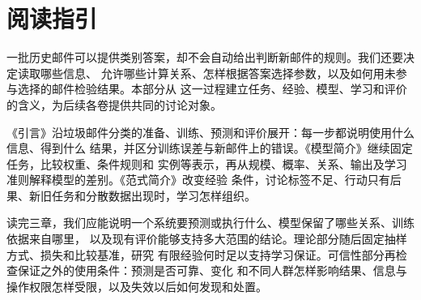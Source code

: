 \chapter*{阅读指引}

一批历史邮件可以提供类别答案，却不会自动给出判断新邮件的规则。我们还要决定读取哪些信息、
允许哪些计算关系、怎样根据答案选择参数，以及如何用未参与选择的邮件检验结果。本部分从
这一过程建立任务、经验、模型、学习和评价的含义，为后续各卷提供共同的讨论对象。

《引言》沿垃圾邮件分类的准备、训练、预测和评价展开：每一步都说明使用什么信息、得到什么
结果，并区分训练误差与新邮件上的错误。《模型简介》继续固定任务，比较权重、条件规则和
实例等表示，再从规模、概率、关系、输出及学习准则解释模型的差别。《范式简介》改变经验
条件，讨论标签不足、行动只有后果、新旧任务和分散数据出现时，学习怎样组织。

读完三章，我们应能说明一个系统要预测或执行什么、模型保留了哪些关系、训练依据来自哪里，
以及现有评价能够支持多大范围的结论。理论部分随后固定抽样方式、损失和比较基准，研究
有限经验何时足以支持学习保证。可信性部分再检查保证之外的使用条件：预测是否可靠、变化
和不同人群怎样影响结果、信息与操作权限怎样受限，以及失效以后如何发现和处置。
